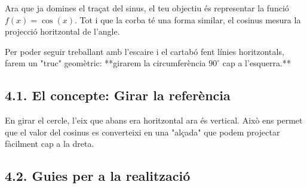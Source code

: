 \documentclass[12pt,a4paper]{article}
\begin{document}
Ara que ja domines el traçat del sinus, el teu objectiu és representar la funció \textbf{$f(x) = \cos(x)$}. Tot i que la corba té una forma similar, el cosinus mesura la projecció horitzontal de l'angle.

Per poder seguir treballant amb l'escaire i el cartabó fent línies horitzontals, farem un "truc" geomètric: **girarem la circumferència $90^\circ$ cap a l'esquerra.**

\subsection*{4.1. El concepte: Girar la referència}

En girar el cercle, l'eix que abans era horitzontal ara és vertical. Això ens permet que el valor del cosinus es converteixi en una "alçada" que podem projectar fàcilment cap a la dreta.

\begin{center}
\end{center}

\subsection*{4.2. Guies per a la realització}
\end{document}
